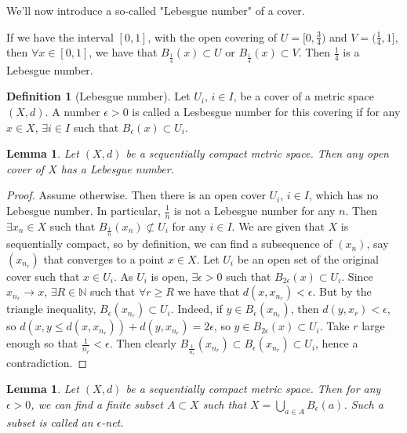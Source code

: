 \documentclass{article}
\theoremstyle{definition}
\newtheorem{defn}{Definition}[section]
\theoremstyle{plain}%
\newtheorem{lem}[thm]{Lemma}
\theoremstyle{remark}
\newcommand{\Union}{\bigcup}
\begin{document}
We'll now introduce a so-called "Lebesgue number" of a cover.

If we have the interval $[0,1]$, with the open covering of $U = [0, \frac{3}{4})$ and $V = (\frac{1}{4}, 1]$, then $\forall x \in [0,1]$, we have that $B_{\frac{1}{4}}(x) \subset U$ or $B_{\frac{1}{4}}(x) \subset V$. Then $\frac{1}{4}$ is a Lebesgue number.

\begin{defn}[Lebesgue number]
    Let $U_i$, $i \in I$, be a cover of a metric space $(X,d)$. A number $\epsilon > 0$ is called a Lesbesgue number for this covering if for any $x \in X$, $\exists i \in I$ such that $B_{\epsilon}(x) \subset U_i$.
\end{defn}

\begin{lem}\label{Existence of Lebesgue}
    Let $(X,d)$ be a sequentially compact metric space. Then any open cover of $X$ has a Lebesgue number.
\end{lem}

\begin{proof}
    Assume otherwise. Then there is an open cover $U_i$, $i \in I$, which has no Lebesgue number. In particular, $\frac{1}{n}$ is not a Lebesgue number for any $n$. Then $\exists x_n \in X$ such that $B_{\frac{1}{n}}(x_n) \not \subset U_i$ for any $i \in I$. We are given that $X$ is sequentially compact, so by definition, we can find a subsequence of $(x_n)$, say $(x_{n_r})$ that converges to a point $x \in X$. Let $U_i$ be an open set of the original cover such that $x \in U_i$. As $U_i$ is open, $\exists \epsilon > 0$ such that $B_{2\epsilon}(x) \subset U_i$. Since $x_{n_r} \to x$, $\exists R \in \mathbb{N}$ such that $\forall r \ge R$ we have that $d(x, x_{n_r}) < \epsilon$. But by the triangle inequality, $B_{\epsilon}(x_{n_r}) \subset U_i$. Indeed, if $y \in B_\epsilon (x_{n_r})$, then $d(y, x_r) < \epsilon$, so $d(x,y \le d(x, x_{n_r})) + d(y, x_{n_r}) = 2\epsilon$, so $y \in B_{2\epsilon}(x) \subset U_i$. Take $r$ large enough so that $\frac{1}{n_r} < \epsilon$. Then clearly $B_{\frac{1}{n_r}}(x_{n_r}) \subset B_{\epsilon}(x_{n_r}) \subset U_i$, hence a contradiction.
\end{proof}

\begin{lem}\label{Epsilon-net}
    Let $(X, d)$ be a sequentially compact metric space. Then for any $\epsilon > 0$, we can find a finite subset $A \subset X$ such that $X = \Union_{a \in A} B_{\epsilon}(a)$. Such a subset is called an $\epsilon$-net.
\end{lem}
\end{document}
